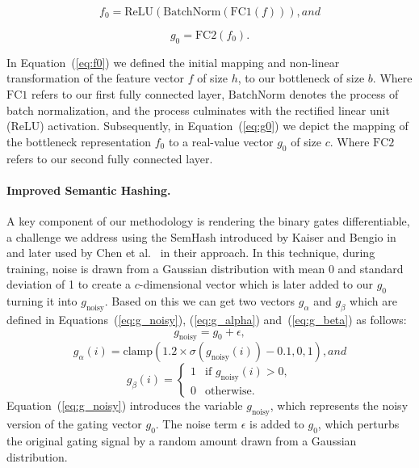 \documentclass[runningheads]{llncs}
\begin{document}
\begin{equation}
f_0 = \text{ReLU}(\text{BatchNorm}(\text{FC1}(f))), and \label{eq:f0}
\end{equation}

\begin{equation}
g_0 = \text{FC2}(f_0). \label{eq:g0}
\end{equation}

In Equation~(\ref{eq:f0}) we defined the initial mapping and non-linear transformation of the feature vector \( f \) of size \( h \), to our bottleneck of size \( b \). Where \(\text{FC1}\) refers to our first fully connected layer, \(\text{BatchNorm}\) denotes the process of batch normalization, and the process culminates with the rectified linear unit (ReLU) activation.
Subsequently, in Equation~(\ref{eq:g0}) we depict the mapping of the bottleneck representation \( f_0 \) to a real-value vector \( g_0 \) of size \( c \). Where \(\text{FC2}\) refers to our second fully connected layer.

\paragraph{Improved Semantic Hashing.} 
A key component of our methodology is rendering the binary gates differentiable, a challenge we address using the SemHash introduced by Kaiser and Bengio in~\cite{kaiser2018discrete} and later used by Chen et al.~\cite{chen2019you} in their approach. In this technique, during training, noise is drawn from a Gaussian distribution with mean 0 and standard deviation of 1 to create a \( c \)-dimensional vector which is later added to our \( g_0 \) turning it into \( g_{\text{noisy}} \). Based on this we can get two vectors \( g_{\alpha} \) and \( g_{\beta} \) which are defined in Equations~(\ref{eq:g_noisy}), (\ref{eq:g_alpha}) and~(\ref{eq:g_beta}) as follows:
\begin{equation}
g_{\text{noisy}} = g_0 + \epsilon, \label{eq:g_noisy}
\end{equation}
\begin{equation}
g_{\alpha}(i) = \text{clamp}(1.2 \times \sigma(g_{\text{noisy}}(i)) - 0.1, 0, 1), and \label{eq:g_alpha}
\end{equation}
\begin{equation}
g_{\beta}(i) = 
\begin{cases}
1 & \text{if } g_{\text{noisy}}(i) > 0, \\
0 & \text{otherwise}.
\end{cases} \label{eq:g_beta}
\end{equation}
Equation~(\ref{eq:g_noisy}) introduces the variable \( g_{\text{noisy}} \), which represents the noisy version of the gating vector \( g_0 \). The noise term \( \epsilon \) is added to \( g_0 \), which perturbs the original gating signal by a random amount drawn from a Gaussian distribution.
\end{document}
